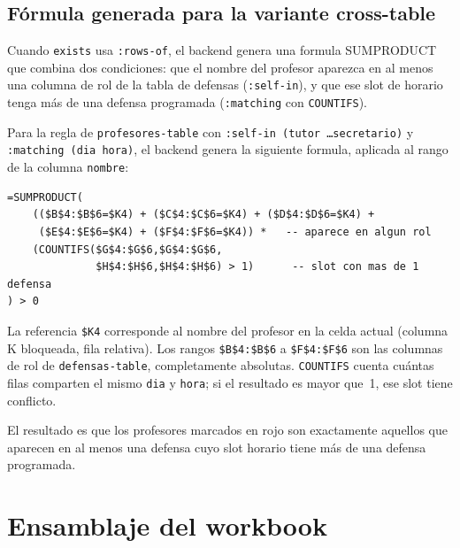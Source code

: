 \documentclass[12pt,a4paper]{report}
\begin{document}
\subsection{F\'ormula generada para la variante cross-table}
\label{sec:cf-cross-table}

Cuando \texttt{exists} usa \texttt{:rows-of}, el backend genera una formula
SUMPRODUCT que combina dos condiciones: que el nombre del profesor aparezca
en al menos una columna de rol de la tabla de defensas (\texttt{:self-in}),
y que ese slot de horario tenga m\'as de una defensa programada
(\texttt{:matching} con \texttt{COUNTIFS}).

Para la regla de \texttt{profesores-table} con
\texttt{:self-in (tutor \ldots secretario)} y \texttt{:matching (dia hora)},
el backend genera la siguiente formula, aplicada al rango de la columna
\texttt{nombre}:

\begin{lstlisting}[style=pythonstyle,
  caption={Formula Excel CF para la variante cross-table (escrita para K4).}]
=SUMPRODUCT(
    (($B$4:$B$6=$K4) + ($C$4:$C$6=$K4) + ($D$4:$D$6=$K4) +
     ($E$4:$E$6=$K4) + ($F$4:$F$6=$K4)) *   -- aparece en algun rol
    (COUNTIFS($G$4:$G$6,$G$4:$G$6,
              $H$4:$H$6,$H$4:$H$6) > 1)      -- slot con mas de 1 defensa
) > 0
\end{lstlisting}

La referencia \texttt{\$K4} corresponde al nombre del profesor en la celda
actual (columna K bloqueada, fila relativa).  Los rangos
\texttt{\$B\$4:\$B\$6} a \texttt{\$F\$4:\$F\$6} son las columnas de rol
de \texttt{defensas-table}, completamente absolutas.  \texttt{COUNTIFS}
cuenta cu\'antas filas comparten el mismo \texttt{dia} y \texttt{hora}; si
el resultado es mayor que~1, ese slot tiene conflicto.

El resultado es que los profesores marcados en rojo son exactamente aquellos
que aparecen en al menos una defensa cuyo slot horario tiene m\'as de una
defensa programada.

\section{Ensamblaje del workbook}
\label{sec:workbook}
\end{document}
